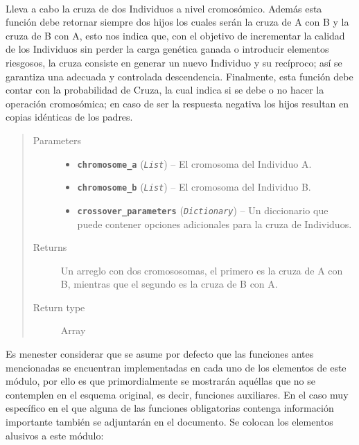 \documentclass[class=report, crop=false]{standalone}
\begin{document}
\begin{fulllineitems}

~
\vspace{-0.1cm}

Lleva a cabo la cruza de dos Individuos a nivel cromosómico.\break
Además esta función debe retornar siempre dos hijos los cuales 
serán la cruza de A con B y la cruza de B con A, esto nos indica que, 
con el objetivo de incrementar la calidad de los Individuos sin perder 
la carga genética ganada o introducir elementos riesgosos, la cruza 
consiste en generar un nuevo Individuo y su recíproco; así se garantiza 
una adecuada y controlada descendencia.\medskip\break
Finalmente, esta función debe contar con la probabilidad de Cruza, la 
cual indica si se debe o no hacer la operación cromosómica; en caso 
de ser la respuesta negativa los hijos resultan en copias idénticas 
de los padres.

\begin{quote}\begin{description}
\item[{Parameters}] \leavevmode\begin{itemize}
\item \textbf{\texttt{chromosome\_a}} (\emph{\texttt{List}}) -- El cromosoma del Individuo A.
\item \textbf{\texttt{chromosome\_b}} (\emph{\texttt{List}}) -- El cromosoma del Individuo B.
\item \textbf{\texttt{crossover\_parameters}} (\emph{\texttt{Dictionary}}) -- Un diccionario que puede contener opciones adicionales para la
cruza de Individuos.
\end{itemize}
\item[{Returns}] \leavevmode
Un arreglo con dos cromososomas, el primero es la cruza de A con B, mientras que el segundo
es la cruza de B con A.
\item[{Return type}] \leavevmode
Array
\end{description}\end{quote}

\end{fulllineitems}

Es menester considerar que se asume por defecto que las funciones antes 
mencionadas se encuentran implementadas en cada uno de los elementos de 
este módulo, por ello es que primordialmente se mostrarán aquéllas que 
no se contemplen en el esquema original, es decir, funciones auxiliares.\break
En el caso muy específico en el que alguna de las funciones obligatorias 
contenga información importante también se adjuntarán en el documento.\medskip\break  
Se colocan los elementos alusivos a este módulo:
\end{document}
